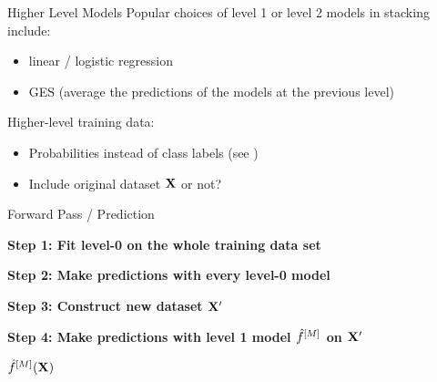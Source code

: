 \documentclass[10pt,compress,t,notes=noshow, xcolor=table]{beamer}
\begin{document}
\begin{vbframe}{Higher Level Models}
\vfill
Popular choices of level 1 or level 2 models in stacking include:
\begin{itemize}
    \item linear / logistic regression 
    \item GES (average the predictions of the models at the previous level)
\end{itemize}
\vfill
Higher-level training data:
\begin{itemize}
    \item Probabilities instead of class labels (see \href{https://dl.acm.org/doi/10.5555/1622859.1622868}{})
    \item Include original dataset $\mathbf{X}$ or not?
\end{itemize}
\vfill
\end{vbframe}


\begin{vbframe}{Forward Pass / Prediction}
\vspace{-1.5em}
\begin{algorithm}[H]
    \SetAlgoLined
    \caption{Prediction Using Single Layer Stacking}

    \BlankLine

    \textbf{Step 1: Fit level-0 on the whole training data set}\;\\
    
    \BlankLine
    \textbf{Step 2: Make predictions with every level-0 model}\;\\
    
    \BlankLine
    \textbf{Step 3: Construct new dataset $\mathbf{X}^\prime$}\;\\
    
    \BlankLine
    \textbf{Step 4: Make predictions with level 1 model $\hat{f}^{[M]}$ on $\mathbf{X}^\prime$}\;
    
    \KwRet $\hat{f}^{[M]}(\mathbf{X})$\;
\end{algorithm}

\end{vbframe}
\end{document}
